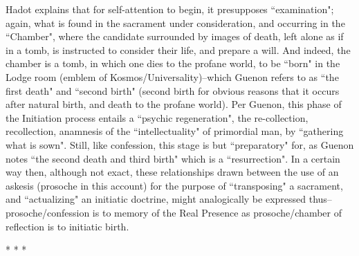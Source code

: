 Hadot explains that for self-attention to begin, it presupposes ``examination"; again, what is found in the sacrament under consideration, and occurring in the ``Chamber", where the candidate surrounded by images of death, left alone as if in a tomb, is instructed to consider their life, and prepare a will. And indeed, the chamber is a tomb, in which one dies to the profane world, to be ``born" in the Lodge room (emblem of Kosmos/Universality)–which Guenon refers to as ``the first death" and ``second birth" (second birth for obvious reasons that it occurs after natural birth, and death to the profane world). Per Guenon, this phase of the Initiation process entails a ``psychic regeneration", the re-collection, recollection, anamnesis of the ``intellectuality" of primordial man, by ``gathering what is sown". Still, like confession, this stage is but ``preparatory" for, as Guenon notes ``the second death and third birth" which is a ``resurrection". In a certain way then, although not exact, these relationships drawn between the use of an askesis (prosoche in this account) for the purpose of ``transposing" a sacrament, and ``actualizing" an initiatic doctrine, might analogically be expressed thus–prosoche/confession is to memory of the Real Presence as prosoche/chamber of reflection is to initiatic birth.




\begin{center}* * *\end{center}

